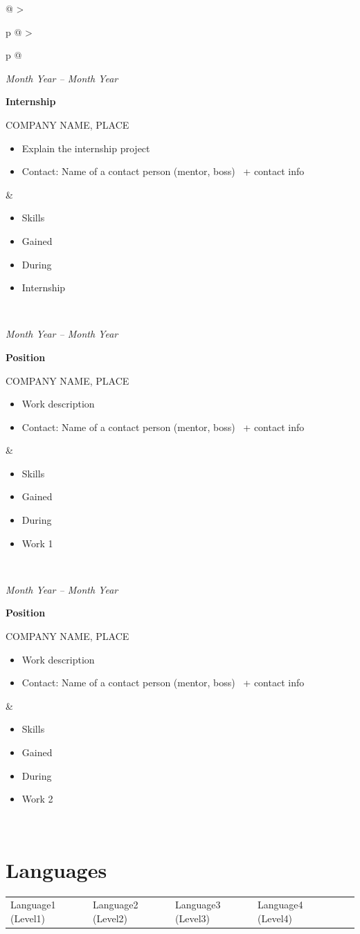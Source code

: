 \documentclass[a4paper,10pt]{article}
\makeatletter
\newlength{\skillsw}
\newlength{\midsep}
\newlength{\leftw}
\newcommand{\datew}{1.5cm}
\newcommand{\entrygap}{12pt}
\newcommand{\cell}[1]{\begin{minipage}[t]{\linewidth}\vspace{0pt}#1\end{minipage}}
\newcommand{\datedentry}[4]{%
  \noindent
  \begin{minipage}[t]{\datew}
    {\small\textit{#1}}
  \end{minipage}%
  \hspace{0.8em}%
  \begin{minipage}[t]{\dimexpr\linewidth-\datew-0.8em\relax}
    \textbf{#2}\par
    {\small #3}\par
    #4
  \end{minipage}\par
}
\newcommand{\skillslist}[1]{%
  \small
  \begin{itemize}[leftmargin=1.2em, itemsep=1pt, topsep=1pt]
    #1
  \end{itemize}
}
\newenvironment{grayblock}{%
  \renewcommand{\arraystretch}{1.05}%
  \begin{longtable}{@{}%
    >{\raggedright\arraybackslash}p{\leftw}%
    @{\hspace{\midsep}}%
    >{\raggedright\arraybackslash\columncolor{black!8}}p{\skillsw}%
    @{}}
}{%
  \end{longtable}
}
\makeatother
\begin{document}
\begin{grayblock}
\cell{\datedentry{Month Year -- Month Year}{Internship}{COMPANY NAME, PLACE}{
  \begin{itemize}
    \item Explain the internship project
    \item Contact: Name of a contact person (mentor, boss) \faPhone\ + contact info
  \end{itemize}
}} &
\cell{\skillslist{
  \item Skills
  \item Gained
  \item During 
  \item Internship
}}\\[\entrygap]

\cell{\datedentry{Month Year -- Month Year}{Position}{COMPANY NAME, PLACE}{
  \begin{itemize}
    \item Work description
    \item Contact: Name of a contact person (mentor, boss) \faPhone\ + contact info
  \end{itemize}
}} &
\cell{\skillslist{
  \item Skills
  \item Gained
  \item During
  \item Work 1
}}\\[\entrygap]

\cell{\datedentry{Month Year -- Month Year}{Position}{COMPANY NAME, PLACE}{
  \begin{itemize}
    \item Work description
    \item Contact: Name of a contact person (mentor, boss) \faPhone\ + contact info
  \end{itemize}
}} &
\cell{\skillslist{
  \item Skills
  \item Gained
  \item During
  \item Work 2
}}\\[2pt]

\end{grayblock}


\section{Languages}

\noindent
\begin{tabular}{@{} l l l l l l @{}}
Language1 (Level1) & Language2 (Level2) & Language3 (Level3) & Language4 (Level4) \\
\end{tabular}
\end{document}
